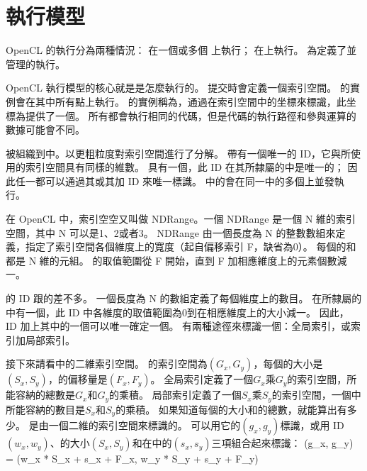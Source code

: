 
\section{執行模型}
OpenCL 的執行分為兩種情況：
在一個或多個 {} 上執行；
在上執行。
為定義了並管理的執行。

OpenCL 執行模型的核心就是是怎麼執行的。
提交時會定義一個索引空間。
的實例會在其中所有點上執行。
的實例稱為，通過在索引空間中的坐標來標識，此坐標為提供了一個。
所有都會執行相同的代碼，但是代碼的執行路徑和參與運算的數據可能會不同。

被組織到中。以更粗粒度對索引空間進行了分解。
帶有一個唯一的 ID，它與所使用的索引空間具有同樣的維數。
具有一個，此 ID 在其所隸屬的中是唯一的；
因此任一都可以通過其或其加 ID 來唯一標識。
中的會在同一中的多個上並發執行。

在 OpenCL 中，索引空空又叫做 NDRange。一個 NDRange 是一個 N 維的索引空間，其中 N 可以是1、2或者3。
NDRange 由一個長度為 N 的整數數組來定義，指定了索引空間各個維度上的寬度（起自偏移索引 F，缺省為0）。
每個的和都是 N 維的元組。
的取值範圍從 F 開始，直到 F 加相應維度上的元素個數減一。

的 ID 跟的差不多。
一個長度為 N 的數組定義了每個維度上的數目。
在所隸屬的中有一個，此 ID 中各維度的取值範圍為0到在相應維度上的大小減一。
因此， ID 加上其中的一個可以唯一確定一個。
有兩種途徑來標識一個：全局索引，或索引加局部索引。

接下來請看中的二維索引空間。
的索引空間為$(G_x, G_y)$，每個的大小是$(S_x, S_y)$，的偏移量是$(F_x, F_y)$。
全局索引定義了一個$G_x$乘$G_y$的索引空間，所能容納的總數是$G_x$和$G_y$的乘積。
局部索引定義了一個$S_x$乘$S_y$的索引空間，一個中所能容納的數目是$S_x$和$S_y$的乘積。
如果知道每個的大小和的總數，就能算出有多少。
是由一個二維的索引空間來標識的。
可以用它的$(g_x, g_y)$標識，或用 ID $(w_x, w_y)$、的大小$(S_x, S_y)$和在中的$(s_x, s_y)$三項組合起來標識：
\startformula
(g_x, g_y) = (w_x * S_x + s_x + F_x, w_y * S_y + s_y + F_y)
\stopformula

